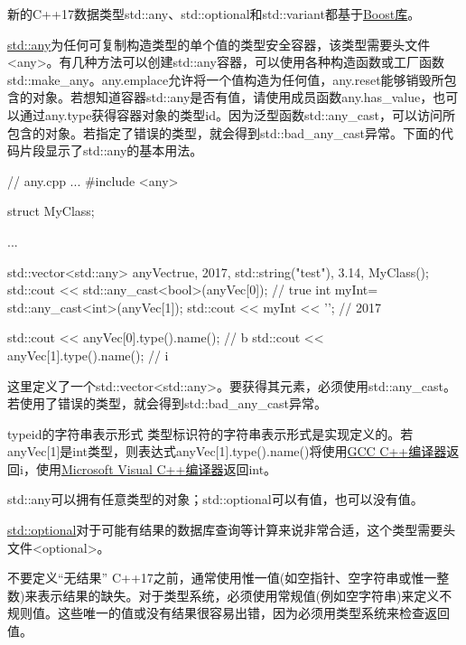 新的C++17数据类型std::any、std::optional和std::variant都基于\href{http://www.boost.org/}{Boost库}。


\href{http://en.cppreference.com/w/cpp/utility/any}{std::any}为任何可复制构造类型的单个值的类型安全容器，该类型需要头文件<any>。有几种方法可以创建std::any容器，可以使用各种构造函数或工厂函数std::make\_any。any.emplace允许将一个值构造为任何值，any.reset能够销毁所包含的对象。若想知道容器std::any是否有值，请使用成员函数any.has\_value，也可以通过any.type获得容器对象的类型id。因为泛型函数std::any\_cast，可以访问所包含的对象。若指定了错误的类型，就会得到std::bad\_any\_cast异常。下面的代码片段显示了std::any的基本用法。


\begin{cpp}
// any.cpp
...
#include <any>

struct MyClass{};

...

std::vector<std::any> anyVec{true, 2017, std::string("test"), 3.14, MyClass()};
std::cout << std::any_cast<bool>(anyVec[0]); // true
int myInt= std::any_cast<int>(anyVec[1]);
std::cout << myInt << '\n'; // 2017

std::cout << anyVec[0].type().name(); // b
std::cout << anyVec[1].type().name(); // i
\end{cpp}

这里定义了一个std::vector<std::any>。要获得其元素，必须使用std::any\_cast。若使用了错误的类型，就会得到std::bad\_any\_cast异常。

\begin{myNotic}{typeid的字符串表示形式}
类型标识符的字符串表示形式是实现定义的。若anyVec[1]是int类型，则表达式anyVec[1].type().name()将使用\href{https://gcc.gnu.org/}{GCC C++编译器}返回i，使用\href{https://en.wikipedia.org/wiki/Microsoft_Visual_C%2B%2B}{Microsoft Visual C++编译器}返回int。
\end{myNotic}

std::any可以拥有任意类型的对象；std::optional可以有值，也可以没有值。


\href{http://en.cppreference.com/w/cpp/utility/optional}{std::optional}对于可能有结果的数据库查询等计算来说非常合适，这个类型需要头文件<optional>。

\begin{myTip}{不要定义“无结果”}
C++17之前，通常使用惟一值(如空指针、空字符串或惟一整数)来表示结果的缺失。对于类型系统，必须使用常规值(例如空字符串)来定义不规则值。这些唯一的值或没有结果很容易出错，因为必须用类型系统来检查返回值。
\end{myTip}


